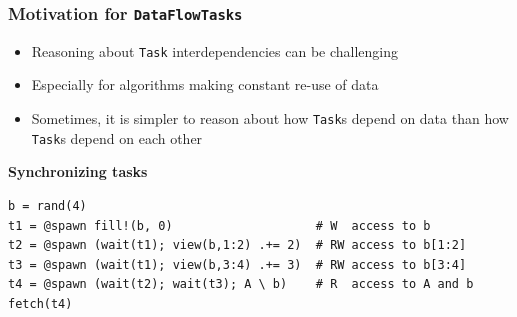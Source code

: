 \documentclass{beamer}
\begin{document}
\begin{frame}[fragile]
	\frametitle{Motivation for \texttt{DataFlowTasks}}
	\begin{itemize}
		\item Reasoning about \texttt{Task} interdependencies can be challenging
		\item Especially for algorithms making constant re-use of data
		\item Sometimes, it is simpler to reason about how \texttt{Task}s depend on data than how \texttt{Task}s depend on each other
	\end{itemize}

	\medskip
	\textbf{Synchronizing tasks}
	\begin{verbatim}
b = rand(4)
t1 = @spawn fill!(b, 0)                    # W  access to b
t2 = @spawn (wait(t1); view(b,1:2) .+= 2)  # RW access to b[1:2]
t3 = @spawn (wait(t1); view(b,3:4) .+= 3)  # RW access to b[3:4]
t4 = @spawn (wait(t2); wait(t3); A \ b)    # R  access to A and b
fetch(t4)
	\end{verbatim}

	\vfill
\end{frame}
\end{document}
